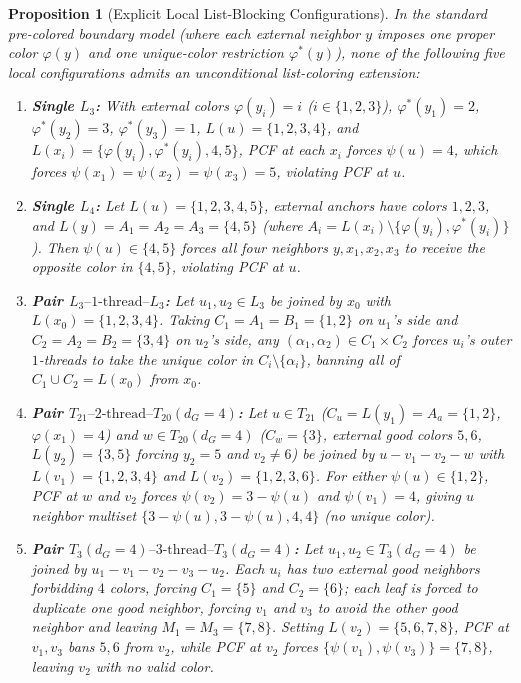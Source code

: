 \documentclass[11pt,a4paper]{article}
\newtheorem{proposition}[theorem]{Proposition}
\theoremstyle{definition}
\begin{document}
\begin{proposition}[Explicit Local List-Blocking Configurations]\label{prop:blocking}
In the standard pre-colored boundary model (where each external neighbor $y$ imposes one proper color $\varphi(y)$ and one unique-color restriction $\varphi^*(y)$), none of the following five local configurations admits an unconditional list-coloring extension:
\begin{enumerate}[label=(\roman*),leftmargin=*,itemsep=2pt]
  \item \textbf{Single $L_3$:} With external colors $\varphi(y_i) = i$ ($i \in \{1,2,3\}$), $\varphi^*(y_1)=2$, $\varphi^*(y_2)=3$, $\varphi^*(y_3)=1$, $L(u) = \{1,2,3,4\}$, and $L(x_i) = \{\varphi(y_i), \varphi^*(y_i), 4, 5\}$, PCF at each $x_i$ forces $\psi(u) = 4$, which forces $\psi(x_1) = \psi(x_2) = \psi(x_3) = 5$, violating PCF at $u$.
  \item \textbf{Single $L_4$:} Let $L(u) = \{1,2,3,4,5\}$, external anchors have colors $1, 2, 3$, and $L(y) = A_1 = A_2 = A_3 = \{4, 5\}$ (where $A_i = L(x_i) \setminus \{\varphi(y_i), \varphi^*(y_i)\}$). Then $\psi(u) \in \{4,5\}$ forces all four neighbors $y, x_1, x_2, x_3$ to receive the opposite color in $\{4,5\}$, violating PCF at $u$.
  \item \textbf{Pair $L_3\text{--}1\text{-thread--}L_3$:} Let $u_1, u_2 \in L_3$ be joined by $x_0$ with $L(x_0) = \{1,2,3,4\}$. Taking $C_1 = A_1 = B_1 = \{1,2\}$ on $u_1$'s side and $C_2 = A_2 = B_2 = \{3,4\}$ on $u_2$'s side, any $(\alpha_1, \alpha_2) \in C_1 \times C_2$ forces $u_i$'s outer $1$-threads to take the unique color in $C_i \setminus \{\alpha_i\}$, banning all of $C_1 \cup C_2 = L(x_0)$ from $x_0$.
  \item \textbf{Pair $T_{21}\text{--}2\text{-thread--}T_{20}(d_G=4)$:} Let $u \in T_{21}$ ($C_u = L(y_1) = A_a = \{1,2\}$, $\varphi(x_1) = 4$) and $w \in T_{20}(d_G=4)$ ($C_w = \{3\}$, external good colors $5, 6$, $L(y_2) = \{3,5\}$ forcing $y_2 = 5$ and $v_2 \neq 6$) be joined by $u - v_1 - v_2 - w$ with $L(v_1) = \{1,2,3,4\}$ and $L(v_2) = \{1,2,3,6\}$. For either $\psi(u) \in \{1,2\}$, PCF at $w$ and $v_2$ forces $\psi(v_2) = 3 - \psi(u)$ and $\psi(v_1) = 4$, giving $u$ neighbor multiset $\{3-\psi(u), 3-\psi(u), 4, 4\}$ (no unique color).
  \item \textbf{Pair $T_3(d_G=4)\text{--}3\text{-thread--}T_3(d_G=4)$:} Let $u_1, u_2 \in T_3(d_G=4)$ be joined by $u_1 - v_1 - v_2 - v_3 - u_2$. Each $u_i$ has two external good neighbors forbidding $4$ colors, forcing $C_1 = \{5\}$ and $C_2 = \{6\}$; each leaf is forced to duplicate one good neighbor, forcing $v_1$ and $v_3$ to avoid the other good neighbor and leaving $M_1 = M_3 = \{7,8\}$. Setting $L(v_2) = \{5,6,7,8\}$, PCF at $v_1, v_3$ bans $5, 6$ from $v_2$, while PCF at $v_2$ forces $\{\psi(v_1), \psi(v_3)\} = \{7,8\}$, leaving $v_2$ with no valid color.
\end{enumerate}
\end{proposition}
\end{document}
